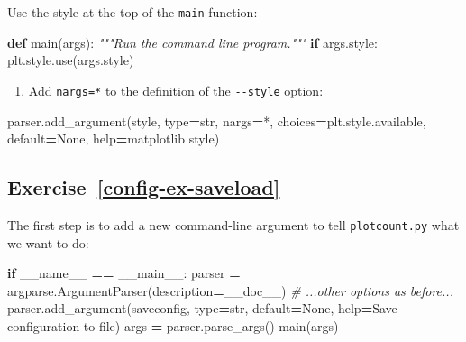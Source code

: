 \documentclass[
]{krantz}
\makeatletter
\newenvironment{Shaded}{\begin{snugshade}}{\end{snugshade}}
\newcommand{\BuiltInTok}[1]{#1}
\newcommand{\CommentTok}[1]{\textcolor[rgb]{0.56,0.35,0.01}{\textit{#1}}}
\newcommand{\ControlFlowTok}[1]{\textcolor[rgb]{0.13,0.29,0.53}{\textbf{#1}}}
\newcommand{\KeywordTok}[1]{\textcolor[rgb]{0.13,0.29,0.53}{\textbf{#1}}}
\newcommand{\NormalTok}[1]{#1}
\newcommand{\OperatorTok}[1]{\textcolor[rgb]{0.81,0.36,0.00}{\textbf{#1}}}
\newcommand{\StringTok}[1]{\textcolor[rgb]{0.31,0.60,0.02}{#1}}
\newcommand{\VariableTok}[1]{\textcolor[rgb]{0.00,0.00,0.00}{#1}}
\providecommand{\tightlist}{%
  \setlength{\itemsep}{0pt}\setlength{\parskip}{0pt}}
\newenvironment{kframe}{%
\medskip{}
\setlength{\fboxsep}{.8em}
 \def\at@end@of@kframe{}%
 \ifinner\ifhmode%
  \def\at@end@of@kframe{\end{minipage}}%
  \begin{minipage}{\columnwidth}%
 \fi\fi%
 \def\FrameCommand##1{\hskip\@totalleftmargin \hskip-\fboxsep
 \colorbox{shadecolor}{##1}\hskip-\fboxsep
     \hskip-\linewidth \hskip-\@totalleftmargin \hskip\columnwidth}%
 \MakeFramed {\advance\hsize-\width
   \@totalleftmargin\z@ \linewidth\hsize
   \@setminipage}}%
 {\par\unskip\endMakeFramed%
 \at@end@of@kframe}
\renewenvironment{Shaded}{\begin{kframe}}{\end{kframe}}
\makeatother
\begin{document}
Use the style at the top of the \texttt{main} function:

\begin{Shaded}
\begin{Highlighting}[]
\KeywordTok{def}\NormalTok{ main(args):}
    \CommentTok{"""Run the command line program."""}
    \ControlFlowTok{if}\NormalTok{ args.style:}
\NormalTok{        plt.style.use(args.style)}
\end{Highlighting}
\end{Shaded}

\begin{enumerate}
\def\labelenumi{\arabic{enumi}.}
\setcounter{enumi}{2}
\tightlist
\item
  Add \texttt{nargs=\textquotesingle{}*\textquotesingle{}} to the definition of the \texttt{-\/-style} option:
\end{enumerate}

\begin{Shaded}
\begin{Highlighting}[]
\NormalTok{parser.add\_argument(}\StringTok{\textquotesingle{}{-}{-}style\textquotesingle{}}\NormalTok{, }\BuiltInTok{type}\OperatorTok{=}\BuiltInTok{str}\NormalTok{, nargs}\OperatorTok{=}\StringTok{\textquotesingle{}*\textquotesingle{}}\NormalTok{, choices}\OperatorTok{=}\NormalTok{plt.style.available,}
\NormalTok{                    default}\OperatorTok{=}\VariableTok{None}\NormalTok{, }\BuiltInTok{help}\OperatorTok{=}\StringTok{\textquotesingle{}matplotlib style\textquotesingle{}}\NormalTok{)}
\end{Highlighting}
\end{Shaded}

\hypertarget{exercise-refconfig-ex-saveload}{%
\subsection*{Exercise~\ref{config-ex-saveload}}\label{exercise-refconfig-ex-saveload}}


The first step is to add a new command-line argument to tell \texttt{plotcount.py} what we want to do:

\begin{Shaded}
\begin{Highlighting}[]
\ControlFlowTok{if} \VariableTok{\_\_name\_\_} \OperatorTok{==} \StringTok{\textquotesingle{}\_\_main\_\_\textquotesingle{}}\NormalTok{:}
\NormalTok{    parser }\OperatorTok{=}\NormalTok{ argparse.ArgumentParser(description}\OperatorTok{=}\NormalTok{\_\_doc\_\_)}
    \CommentTok{\# ...other options as before...}
\NormalTok{    parser.add\_argument(}\StringTok{\textquotesingle{}{-}{-}saveconfig\textquotesingle{}}\NormalTok{, }\BuiltInTok{type}\OperatorTok{=}\BuiltInTok{str}\NormalTok{, default}\OperatorTok{=}\VariableTok{None}\NormalTok{,}
                        \BuiltInTok{help}\OperatorTok{=}\StringTok{\textquotesingle{}Save configuration to file\textquotesingle{}}\NormalTok{)}
\NormalTok{    args }\OperatorTok{=}\NormalTok{ parser.parse\_args()}
\NormalTok{    main(args)}
\end{Highlighting}
\end{Shaded}
\end{document}
